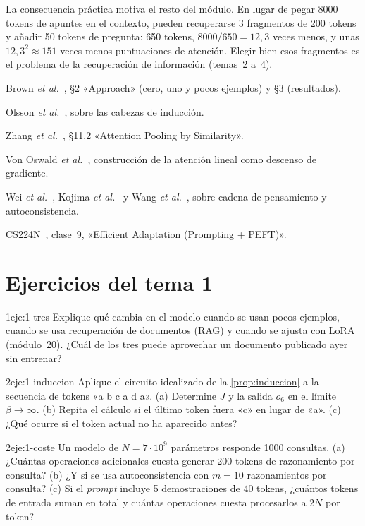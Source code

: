 La consecuencia práctica motiva el resto del módulo. En lugar de pegar 8000 tokens de apuntes en el contexto, pueden recuperarse 3 fragmentos de 200 tokens y añadir 50 tokens de pregunta: 650 tokens, $8000/650=12{,}3$ veces menos, y unas $12{,}3^{2}\approx 151$ veces menos puntuaciones de atención. Elegir bien esos fragmentos es el problema de la recuperación de información (temas~2 a~4).

\begin{lecturas}
\item Brown \emph{et al.}~\cite{brown}, §2 «Approach» (cero, uno y pocos ejemplos) y §3 (resultados).
\item Olsson \emph{et al.}~\cite{olsson}, sobre las cabezas de inducción.
\item Zhang \emph{et al.}~\cite{d2l}, §11.2 «Attention Pooling by Similarity».
\item Von Oswald \emph{et al.}~\cite{vonoswald}, construcción de la atención lineal como descenso de gradiente.
\item Wei \emph{et al.}~\cite{wei-cot}, Kojima \emph{et al.}~\cite{kojima} y Wang \emph{et al.}~\cite{wang-sc}, sobre cadena de pensamiento y autoconsistencia.
\item CS224N~\cite{cs224n}, clase~9, «Efficient Adaptation (Prompting + PEFT)».
\end{lecturas}

\section*{Ejercicios del tema 1}

\begin{ejercicio}{1}{eje:1-tres}
Explique qué cambia en el modelo cuando se usan pocos ejemplos, cuando se usa recuperación de documentos (RAG) y cuando se ajusta con LoRA (módulo~20). ¿Cuál de los tres puede aprovechar un documento publicado ayer sin entrenar?
\end{ejercicio}

\begin{ejercicio}{2}{eje:1-induccion}
Aplique el circuito idealizado de la \cref{prop:induccion} a la secuencia de tokens «a b c a d a». (a) Determine $J$ y la salida $o_6$ en el límite $\beta\to\infty$. (b) Repita el cálculo si el último token fuera «c» en lugar de «a». (c) ¿Qué ocurre si el token actual no ha aparecido antes?
\end{ejercicio}

\begin{ejercicio}{2}{eje:1-coste}
Un modelo de $N=7\cdot 10^{9}$ parámetros responde 1000 consultas. (a) ¿Cuántas operaciones adicionales cuesta generar 200 tokens de razonamiento por consulta? (b) ¿Y si se usa autoconsistencia con $m=10$ razonamientos por consulta? (c) Si el \emph{prompt} incluye 5 demostraciones de 40 tokens, ¿cuántos tokens de entrada suman en total y cuántas operaciones cuesta procesarlos a $2N$ por token?
\end{ejercicio}

